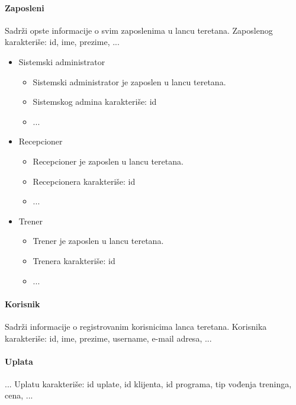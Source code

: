 \documentclass[../main.tex]{subfiles}
\begin{document}
\paragraph{Zaposleni}
Sadrži opste informacije o svim zaposlenima u lancu teretana.
Zaposlenog karakteriše: id, ime, prezime, ...
\begin{itemize}
    \item Sistemski administrator
\begin{itemize}
    \item Sistemski administrator je zaposlen u lancu teretana.
    \item Sistemskog admina karakteriše: id
    \item ...
\end{itemize}

\item Recepcioner
\begin{itemize}
    \item Recepcioner je zaposlen u lancu teretana.
    \item Recepcionera karakteriše: id
    \item ...
\end{itemize}

\item Trener
\begin{itemize}
    \item Trener je zaposlen u lancu teretana.
    \item Trenera karakteriše: id
    \item ...
\end{itemize}
\end{itemize}

\paragraph{Korisnik}
Sadrži informacije o registrovanim korisnicima lanca teretana.
Korisnika karakteriše: id, ime, prezime, username, e-mail adresa, ...

\paragraph{Uplata}
...
Uplatu karakteriše: id uplate, id klijenta, id programa, tip vođenja treninga, cena, ...
\end{document}
